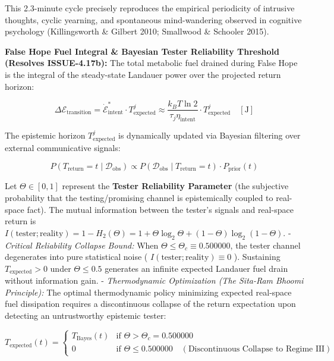 \documentclass[11pt,a4paper]{article}
\theoremstyle{definition}
\theoremstyle{remark}
\begin{document}
This 2.3-minute cycle precisely reproduces the empirical periodicity of intrusive thoughts, cyclic yearning, and spontaneous mind-wandering observed in cognitive psychology (Killingsworth \& Gilbert 2010; Smallwood \& Schooler 2015).

\textbf{False Hope Fuel Integral \& Bayesian Tester Reliability Threshold (Resolves ISSUE-4.17b):}
The total metabolic fuel drained during False Hope is the integral of the steady-state Landauer power over the projected return horizon:


\begin{equation}
\Delta\mathcal{E}_{\text{transition}} = \dot{\mathcal{E}}_{\text{intent}}^* \cdot T_{\text{expected}}^j \approx \frac{k_B T \ln 2}{\tau_j \eta_{\text{intent}}} \cdot T_{\text{expected}}^j \quad [\text{J}]
\end{equation}


The epistemic horizon $T_{\text{expected}}^j$ is dynamically updated via Bayesian filtering over external communicative signals:


\begin{equation}
P(T_{\text{return}} = t \mid \mathcal{D}_{\text{obs}}) \propto P(\mathcal{D}_{\text{obs}} \mid T_{\text{return}} = t) \cdot P_{\text{prior}}(t)
\end{equation}


Let $\Theta \in [0, 1]$ represent the \textbf{Tester Reliability Parameter} (the subjective probability that the testing/promising channel is epistemically coupled to real-space fact). The mutual information between the tester's signals and real-space return is $I(\text{tester}; \text{reality}) = 1 - H_2(\Theta) = 1 + \Theta\log_2\Theta + (1-\Theta)\log_2(1-\Theta)$.
- \textit{Critical Reliability Collapse Bound:} When $\Theta \le \Theta_c \equiv 0.500000$, the tester channel degenerates into pure statistical noise ( $I(\text{tester}; \text{reality}) \equiv 0$ ). Sustaining $T_{\text{expected}} > 0$ under $\Theta \le 0.5$ generates an infinite expected Landauer fuel drain without information gain.
- \textit{Thermodynamic Optimization (The Sita-Ram Bhoomi Principle):} The optimal thermodynamic policy minimizing expected real-space fuel dissipation requires a discontinuous collapse of the return expectation upon detecting an untrustworthy epistemic tester:


\begin{equation}
\boxed{T_{\text{expected}}(t) = \begin{cases} T_{\text{Bayes}}(t) & \text{if } \Theta > \Theta_c = 0.500000 \\ 0 & \text{if } \Theta \le 0.500000 \quad \left(\text{Discontinuous Collapse to Regime III}\right) \end{cases}}
\end{equation}
\end{document}
